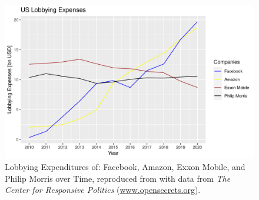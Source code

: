 \begin{figure}
    \centering
    \includegraphics[width=\textwidth]{figures/Lobbying_Expenditures.png}
    \caption{Lobbying Expenditures of: Facebook, Amazon, Exxon Mobile, and Philip Morris over Time, reproduced from \citep{chung_big_2021} with data from \textit{The Center for Responsive Politics} (\href{https://www.opensecrets.org/}{www.opensecrets.org}).}
    \label{fig:lob_exp}
\end{figure}
